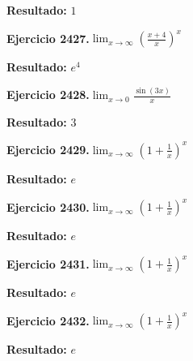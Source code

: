 \documentclass[10pt,a4paper]{article}
\begin{document}
\begin{solbox}
\textbf{Resultado:} \(\displaystyle 1\)
\end{solbox}

\newpage
\begin{ejbox}
\textbf{Ejercicio 2427.}\quad $\lim_{x\to \infty} \left(\frac{x+4}{x}\right)^{x}$
\end{ejbox}

\begin{solbox}
\textbf{Resultado:} \(\displaystyle e^{4}\)
\end{solbox}

\begin{ejbox}
\textbf{Ejercicio 2428.}\quad $\lim_{x\to 0} \frac{\sin(3x)}{x}$
\end{ejbox}

\begin{solbox}
\textbf{Resultado:} \(\displaystyle 3\)
\end{solbox}

\begin{ejbox}
\textbf{Ejercicio 2429.}\quad $\lim_{x\to \infty} \left(1+\frac{1}{x}\right)^x$
\end{ejbox}

\begin{solbox}
\textbf{Resultado:} \(\displaystyle e\)
\end{solbox}

\newpage
\begin{ejbox}
\textbf{Ejercicio 2430.}\quad $\lim_{x\to \infty} \left(1+\frac{1}{x}\right)^x$
\end{ejbox}

\begin{solbox}
\textbf{Resultado:} \(\displaystyle e\)
\end{solbox}

\begin{ejbox}
\textbf{Ejercicio 2431.}\quad $\lim_{x\to \infty} \left(1+\frac{1}{x}\right)^x$
\end{ejbox}

\begin{solbox}
\textbf{Resultado:} \(\displaystyle e\)
\end{solbox}

\begin{ejbox}
\textbf{Ejercicio 2432.}\quad $\lim_{x\to \infty} \left(1+\frac{1}{x}\right)^x$
\end{ejbox}

\begin{solbox}
\textbf{Resultado:} \(\displaystyle e\)
\end{solbox}
\end{document}
